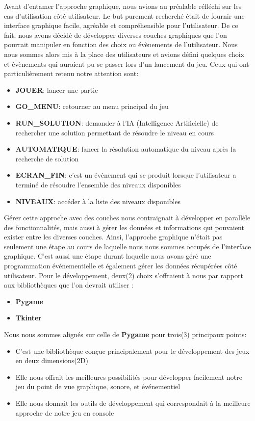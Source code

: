 \documentclass[a4paper,12pt]{article} %
\begin{document}
Avant d'entamer l'approche graphique, nous avions au préalable réfléchi sur les cas d'utilisation côté utilisateur. Le but purement recherché était de fournir une interface graphique facile, agréable et compréhensible pour l'utilisateur. De ce fait, nous avons décidé de développer diverses couches graphiques que l'on pourrait manipuler en fonction des choix ou évènements de l'utilisateur.
\newline
Nous nous sommes alors mis à la place des utilisateurs et avions défini quelques choix et évènements qui auraient pu se passer lors d'un lancement du jeu. Ceux qui ont particulièrement retenu notre attention sont:
\begin{itemize}
	\item \textbf{JOUER}: lancer une partie 
	\item \textbf{GO\_MENU}: retourner au menu principal du jeu
	\item \textbf{RUN\_SOLUTION}: demander à l'IA (Intelligence Artificielle) de rechercher une solution permettant de résoudre le niveau en cours
	\item \textbf{AUTOMATIQUE}: lancer la résolution automatique du niveau après la recherche de solution
	\item \textbf{ECRAN\_FIN}: c'est un événement qui se produit lorsque l'utilisateur a terminé de résoudre l'ensemble des niveaux disponibles
	\item \textbf{NIVEAUX}: accéder à la liste des niveaux disponibles
\end{itemize}
Gérer cette approche avec des couches nous contraignait à développer en parallèle des fonctionnalités, mais aussi à gérer les données et informations qui pouvaient exister entre les diverses couches. Ainsi, l'approche graphique n'était pas seulement une étape au cours de laquelle nous nous sommes occupés de l'interface graphique. C'est aussi une étape durant laquelle nous avons géré une programmation événementielle et également gérer les données récupérées côté utilisateur.
\newline
Pour le développement, deux(2) choix s'offraient à nous par rapport aux bibliothèques que l'on devrait utiliser :
\begin{itemize}
	\item \textbf{Pygame}
	\item \textbf{Tkinter}
\end{itemize}
Nous nous sommes alignés sur celle de \textbf{Pygame} pour trois(3) principaux points:
\begin{itemize}
	\item C'est une bibliothèque conçue principalement pour le développement des jeux en deux dimensions(2D)
	\item Elle nous offrait les meilleures possibilités pour développer facilement notre jeu du point de vue graphique, sonore, et événementiel
	\item Elle nous donnait les outils de développement qui correspondait à la meilleure approche de notre jeu en console
\end{itemize}
\end{document}
